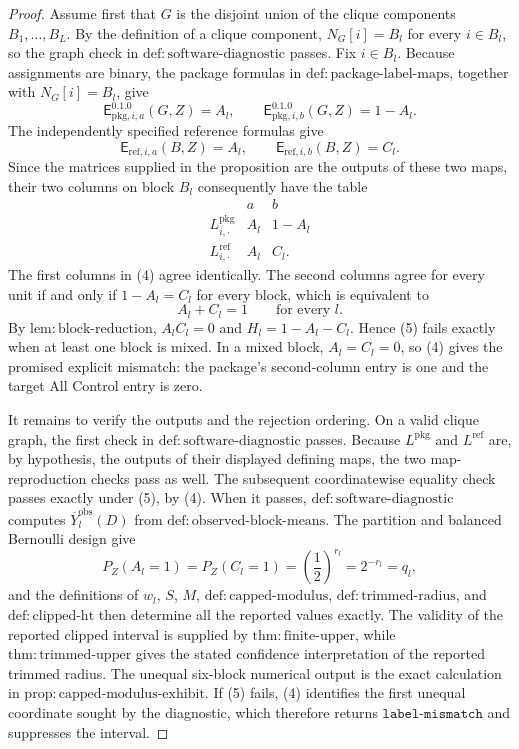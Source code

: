 \documentclass{article}
\begin{document}
\begin{proof}
Assume first that \(G\) is the disjoint union of the clique components
\(B_1,\ldots,B_L\).  By the definition of a clique component,
\(N_G[i]=B_l\) for every \(i\in B_l\), so the graph check in
\(\mathrm{def{:}software\text{-}diagnostic}\) passes.  Fix \(i\in B_l\).
Because assignments are binary, the package formulas in
\(\mathrm{def{:}package\text{-}label\text{-}maps}\), together with
\(N_G[i]=B_l\), give
\[
 \mathsf E^{0.1.0}_{\mathrm{pkg},i,a}(G,Z)=A_l,
 \qquad
 \mathsf E^{0.1.0}_{\mathrm{pkg},i,b}(G,Z)=1-A_l.
\]
The independently specified reference formulas give
\[
 \mathsf E_{\mathrm{ref},i,a}(B,Z)=A_l,
 \qquad
 \mathsf E_{\mathrm{ref},i,b}(B,Z)=C_l.
\]
Since the matrices supplied in the proposition are the outputs of these two maps, their two columns on block \(B_l\) consequently have the table
\[
 \begin{array}{c|cc}
  &a&b\\ \hline
 L^{\mathrm{pkg}}_{i,\cdot}&A_l&1-A_l\\
 L^{\mathrm{ref}}_{i,\cdot}&A_l&C_l.
 \end{array}
\tag{4}
\]
The first columns in (4) agree identically.  The second columns agree for every unit if and only if
\(1-A_l=C_l\) for every block, which is equivalent to
\[
 A_l+C_l=1\qquad\text{for every }l.
\tag{5}
\]
By \(\mathrm{lem{:}block\text{-}reduction}\), \(A_lC_l=0\) and
\(H_l=1-A_l-C_l\).  Hence (5) fails exactly when at least one block is mixed.  In a mixed block, \(A_l=C_l=0\), so (4) gives the promised explicit mismatch: the package's second-column entry is one and the target All Control entry is zero.

It remains to verify the outputs and the rejection ordering.  On a valid clique graph, the first check in
\(\mathrm{def{:}software\text{-}diagnostic}\) passes.  Because
\(L^{\mathrm{pkg}}\) and \(L^{\mathrm{ref}}\) are, by hypothesis, the outputs of their displayed defining maps, the two map-reproduction checks pass as well.  The subsequent coordinatewise equality check passes exactly under (5), by (4).  When it passes,
\(\mathrm{def{:}software\text{-}diagnostic}\) computes
\(\overline Y_l^{\mathrm{obs}}(D)\) from
\(\mathrm{def{:}observed\text{-}block\text{-}means}\).  The partition and balanced Bernoulli design give
\[
 P_Z(A_l=1)=P_Z(C_l=1)=\left(\frac12\right)^{r_l}=2^{-r_l}=q_l,
\]
and the definitions of \(w_l\), \(S\), \(M\),
\(\mathrm{def{:}capped\text{-}modulus}\),
\(\mathrm{def{:}trimmed\text{-}radius}\), and
\(\mathrm{def{:}clipped\text{-}ht}\) then determine all the reported values exactly.  The validity of the reported clipped interval is supplied by
\(\mathrm{thm{:}finite\text{-}upper}\), while
\(\mathrm{thm{:}trimmed\text{-}upper}\) gives the stated confidence interpretation of the reported trimmed radius.  The unequal six-block numerical output is the exact calculation in
\(\mathrm{prop{:}capped\text{-}modulus\text{-}exhibit}\).  If (5) fails, (4) identifies the first unequal coordinate sought by the diagnostic, which therefore returns
\(\texttt{label-mismatch}\) and suppresses the interval.


\end{proof}
\end{document}
